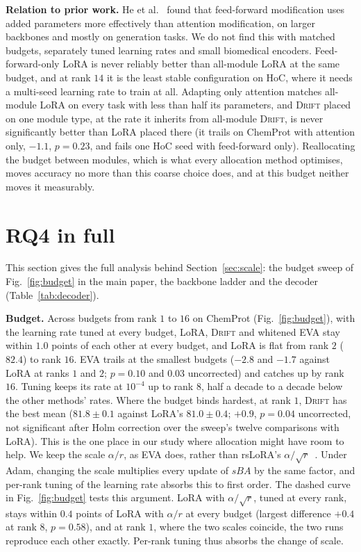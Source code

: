 \documentclass[conference,onecolumn]{IEEEtran}
\newcommand{\method}{\textsc{Drift}}
\begin{document}
\noindent\textbf{Relation to prior work.} He et al.~\cite{he2022unified} found
that feed-forward modification uses added parameters more effectively than
attention modification, on larger backbones and mostly on generation tasks. We
do not find this with matched budgets, separately tuned learning rates and small
biomedical encoders. Feed-forward-only LoRA is never reliably better than
all-module LoRA at the same budget, and at rank $14$ it is the least stable
configuration on HoC, where it needs a multi-seed learning rate to train at all.
Adapting only attention matches all-module LoRA on every task with less than
half its parameters, and \method{} placed on one module type, at the rate it
inherits from all-module \method{}, is never significantly better than LoRA
placed there (it trails on ChemProt with
attention only, $-1.1$, $p = 0.23$, and fails one HoC seed with feed-forward
only). Reallocating the budget between modules, which is what every allocation
method optimises, moves accuracy no more than this coarse choice does, and at
this budget neither moves it measurably.

\section{RQ4 in full}
\label{sup:rq4}
This section gives the full analysis behind Section~\ref{sec:scale}: the budget sweep of Fig.~\ref{fig:budget} in the main paper, the backbone ladder and the decoder (Table~\ref{tab:decoder}).


\noindent\textbf{Budget.} Across budgets from rank $1$ to $16$ on ChemProt
(Fig.~\ref{fig:budget}), with the learning rate tuned at every budget, LoRA,
\method{} and whitened EVA stay within $1.0$ points of each other at every
budget, and LoRA is flat from rank $2$ ($82.4$) to rank $16$. EVA trails at the
smallest budgets ($-2.8$ and $-1.7$ against LoRA at ranks $1$ and $2$; $p = 0.10$
and $0.03$ uncorrected) and catches up by rank $16$. Tuning keeps its rate at
$10^{-4}$ up to rank $8$, half a decade to a decade below the other methods'
rates. Where the budget binds hardest, at rank $1$, \method{} has the
best mean ($81.8\pm0.1$ against LoRA's $81.0\pm0.4$; $+0.9$, $p = 0.04$
uncorrected, not significant after Holm correction over the sweep's twelve
comparisons with LoRA). This is the one place in our study where allocation
might have room to help. We keep the scale $\alpha/r$, as EVA does, rather than
rsLoRA's $\alpha/\sqrt{r}$~\cite{kalajdzievski2023rslora}. Under Adam, changing
the scale multiplies every update of $sBA$ by the same factor, and per-rank
tuning of the learning rate absorbs this to first order. The dashed curve in
Fig.~\ref{fig:budget} tests this argument. LoRA with $\alpha/\sqrt{r}$, tuned at
every rank, stays within $0.4$ points of LoRA with $\alpha/r$ at every budget
(largest difference $+0.4$ at rank $8$, $p = 0.58$), and at rank $1$, where the
two scales coincide, the two runs reproduce each other exactly. Per-rank tuning
thus absorbs the change of scale.
\end{document}
